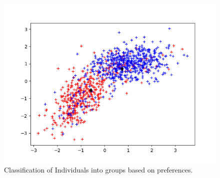 \documentclass[12pt]{article}
\begin{document}
\begin{enumerate}[label=(\Alph*)]
  	\begin{figure}[h!]
  	\centering
  	\includegraphics{starter/2Bv.png}
  	\caption{Classification of Individuals into groups based on preferences.}
  	\label{fig:2Bv}
  	\end{figure}



























\end{enumerate}
\end{document}
